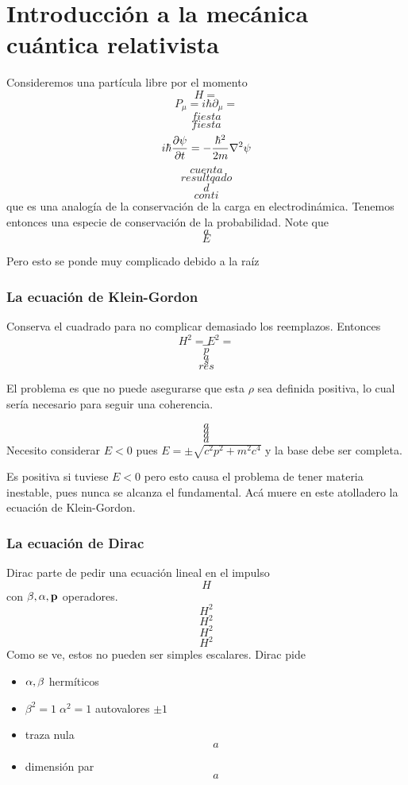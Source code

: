 \documentclass[10pt,oneside]{CBFT_book}
\begin{document}
\chapter{Introducción a la mecánica cuántica relativista}

Consideremos una partícula libre por el momento 
\[
	H =
\]
\[
	P_\mu = i \hbar \partial_\mu = 
\]
\[
	fiesta
\]
\[
	fiesta
\]
\[
	i \hbar \frac{\partial^{\hspace{-0.05em}} {\psi}}{\partial {t}^{\hspace{-0.05em}}} = - \frac{\hbar^2}{2m} \nabla^2 \psi
\]
\[
	cuenta 
\]
\[
	resultqado
\]
\[
	d
\]
\[
	conti
\]
que es una analogía de la conservación de la carga en electrodinámica.
Tenemos entonces una especie de conservación de la probabilidad. Note que 
\[
	a
\]
\[
	E
\]

Pero esto se ponde muy complicado debido a la raíz

\subsection{La ecuación de Klein-Gordon}

Conserva el cuadrado para no complicar demasiado los reemplazos. Entonces 
\[
	H^2 = E^2 = 
\]
\[
	-
\]
\[
	p
\]
\[
	a
\]
\[
	s
\]
\[
	res
\]

El problema es que no puede asegurarse que esta $\rho$ sea definida positiva, lo cual sería necesario para 
seguir una coherencia.

\[
	a
\]
\[
	a
\]
\[
	a
\]
\[
	a
\]
Necesito considerar $E<0$ pues $E=\pm\sqrt{c^2p^2+m^2c^4}$ y la base debe ser completa.

Es positiva si tuviese $E<0$ pero esto causa el problema de tener materia inestable, pues nunca se alcanza el 
fundamental. Acá muere en este atolladero la ecuación de Klein-Gordon.

\subsection{La ecuación de Dirac}

Dirac parte de pedir una ecuación lineal en el impulso 
\[
	H
\]
con $\beta,\vb{\alpha},\vb{p}$ operadores.
\[
	H^2
\]
\[
	H^2
\]
\[
	H^2
\]
\[
	H^2
\]
Como se ve, estos no pueden ser simples escalares. Dirac pide 
\begin{itemize}
 \item $\vb{\alpha},\beta$ hermíticos
 \item $\beta^2=1 \; \alpha^2=1$ autovalores $\pm 1$
 \item traza nula
 \[
	a
 \]
 \item dimensión par 
 \[
	a
 \]
\end{itemize}
\end{document}
